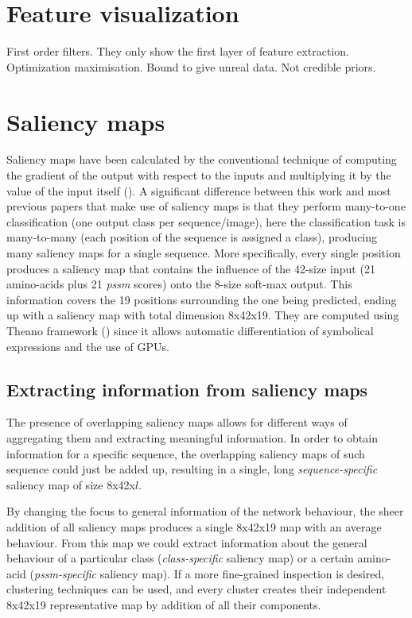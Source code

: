 

\section{Feature visualization}
First order filters. They only show the first layer of feature extraction.
Optimization maximisation. Bound to give unreal data. Not credible priors.


\section{Saliency maps} \label{sect:saliency}


Saliency maps have been calculated by the conventional technique of computing the gradient of the output with respect to the inputs and multiplying it by the value of the input itself (\cite{Shrikumar2016}). A significant difference between this work and most previous papers that make use of saliency maps is that they perform many-to-one classification (one output class per sequence/image), here the classification task is many-to-many (each position of the sequence is assigned a class), producing many saliency maps for a single sequence. More specifically, every single position produces a saliency map that contains the influence of the 42-size input (21 amino-acids plus 21 \textit{pssm} scores) onto the 8-size soft-max output. This information covers the 19 positions surrounding the one being predicted, ending up with a saliency map with total dimension 8x42x19. They are computed using Theano framework (\cite{TheTheanoDevelopmentTeam2016}) since it allows automatic differentiation of symbolical expressions and the use of GPUs.

\subsection{Extracting information from saliency maps}
The presence of overlapping saliency maps allows for different ways of aggregating them and extracting meaningful information. In order to obtain information for a specific sequence, the overlapping saliency maps of such sequence could just be added up, resulting in a single, long \textit{sequence-specific} saliency map of size 8x42x$l$.

By changing the focus to general information of the network behaviour, the sheer addition of all saliency maps produces a single 8x42x19 map with an average behaviour. From this map we could extract information about the general behaviour of a particular class (\textit{class-specific} saliency map) or a certain amino-acid (\textit{pssm-specific} saliency map). If a more fine-grained inspection is desired, clustering techniques can be used, and every cluster creates their independent 8x42x19 representative map by addition of all their components.


